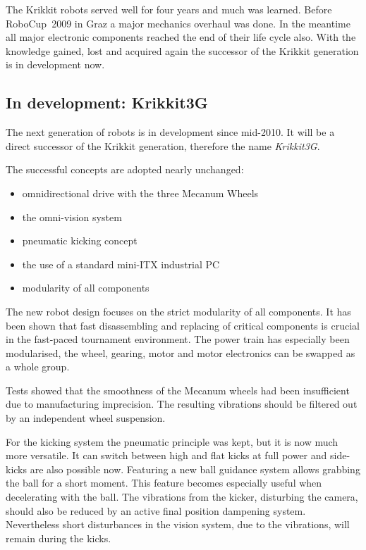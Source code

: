 \documentclass[12pt,a4paper]{article}
\begin{document}
The Krikkit robots served well for four years and much was learned.
Before RoboCup~2009 in Graz a major mechanics overhaul was done.
In the meantime all major electronic components reached the end of their life cycle also.
With the knowledge gained, lost and acquired again the successor of the Krikkit generation is in development now.
    

\subsection{In development: Krikkit3G}

The next generation of robots is in development since mid-2010.
It will be a direct successor of the Krikkit generation, therefore the name \emph{Krikkit3G}.

The successful concepts are adopted nearly unchanged:\nopagebreak[4] %
\begin{itemize}
  \item omnidirectional drive with the three Mecanum Wheels
  \item the omni-vision system
  \item pneumatic kicking concept
  \item the use of a standard mini-ITX industrial PC
  \item modularity of all components
\end{itemize}

The new robot design focuses on the strict modularity of all components.
It has been shown that fast disassembling and replacing of critical components is crucial in the fast-paced tournament environment.
The power train has especially been modularised, the wheel, gearing, motor and motor electronics can be swapped as a whole group.

Tests showed that the smoothness of the Mecanum wheels had been insufficient due to manufacturing imprecision.
The resulting vibrations should be filtered out by an independent wheel suspension.


For the kicking system the pneumatic principle was kept, but it is now much more versatile. 
It can switch between high and flat kicks at full power and side-kicks are also possible now.
Featuring a new ball guidance system allows grabbing the ball for a short moment.
This feature becomes especially useful when decelerating with the ball.
The vibrations from the kicker, disturbing the camera, should also be reduced by an active final position dampening system.
Nevertheless short disturbances in the vision system, due to the vibrations, will remain during the kicks.
\end{document}
